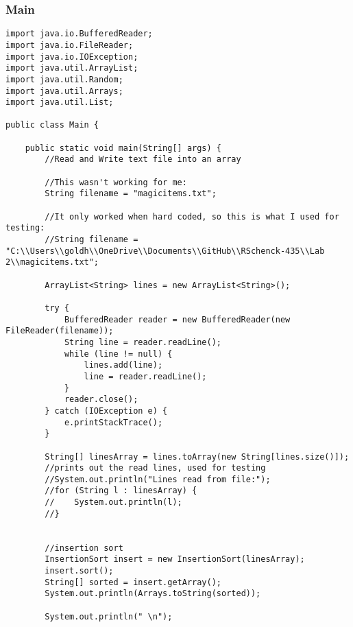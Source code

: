 \documentclass[10pt]{article}
\begin{document}
\subsubsection{Main}
\lstset{numbers=left, numberstyle=\tiny, stepnumber=1, numbersep=5pt, basicstyle=\footnotesize\ttfamily}
\begin{lstlisting}[frame=single, ]  
import java.io.BufferedReader;
import java.io.FileReader;
import java.io.IOException;
import java.util.ArrayList;
import java.util.Random;
import java.util.Arrays;
import java.util.List;

public class Main {
    
    public static void main(String[] args) {
        //Read and Write text file into an array

        //This wasn't working for me: 
        String filename = "magicitems.txt";

        //It only worked when hard coded, so this is what I used for testing:
        //String filename = "C:\\Users\\goldh\\OneDrive\\Documents\\GitHub\\RSchenck-435\\Lab 2\\magicitems.txt";

        ArrayList<String> lines = new ArrayList<String>();

        try {
            BufferedReader reader = new BufferedReader(new FileReader(filename));
            String line = reader.readLine();
            while (line != null) {
                lines.add(line);
                line = reader.readLine();
            }
            reader.close();
        } catch (IOException e) {
            e.printStackTrace();
        }

        String[] linesArray = lines.toArray(new String[lines.size()]);
        //prints out the read lines, used for testing
        //System.out.println("Lines read from file:");
        //for (String l : linesArray) {
        //    System.out.println(l);
        //}


        //insertion sort
        InsertionSort insert = new InsertionSort(linesArray);
        insert.sort();
        String[] sorted = insert.getArray();
        System.out.println(Arrays.toString(sorted));

        System.out.println(" \n");



\end{lstlisting}
\end{document}
